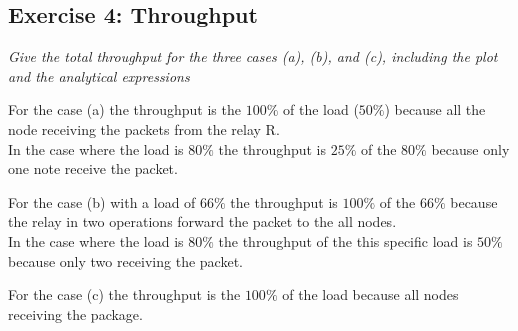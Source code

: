\subsection{Exercise 4: Throughput}
\textit{Give the total throughput for the three cases (a), (b), and (c), including the plot and the analytical expressions}\\
\begin{pitemize}
\item For the case (a) the throughput is the $100 \%$ of the load ($50 \%$) because all the node receiving the packets from the relay R. \\In the case where the load is $80 \%$ the throughput is $25 \%$ of the $80 \%$ because only one note receive the packet.
\item For the case (b) with a load of $66\%$ the throughput is $100 \%$ of the $66\%$ because the relay in two operations forward the packet to the all nodes. \\ In the case where the load is $80 \%$ the throughput of the this specific load is $50 \%$ because only two receiving the packet.
\item For the case (c) the throughput is the $100 \%$ of the load because all nodes receiving the package. 
\end{pitemize}
